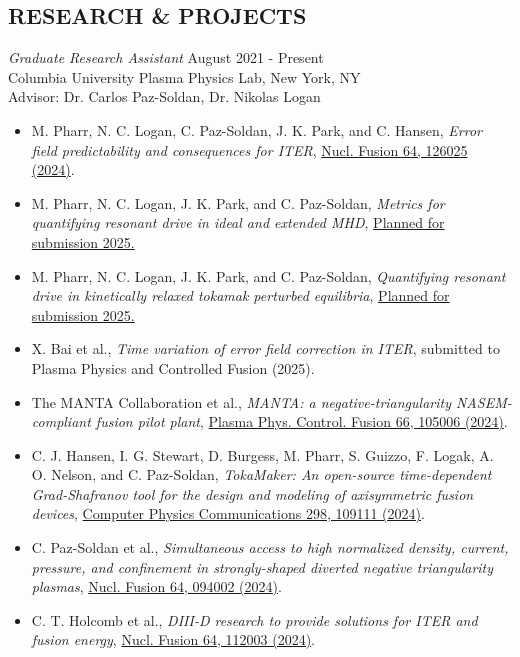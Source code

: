 \documentclass[margin]{rpires}
\begin{document}
\begin{resume}
\section{RESEARCH \& PROJECTS}
    \textit{Graduate Research Assistant} \hfill August 2021 - Present \\
    Columbia University Plasma Physics Lab, 
    New York, NY\\ 
    Advisor: Dr. Carlos Paz-Soldan, Dr. Nikolas Logan
    \begin{itemize}  \itemsep -2pt %
    \item {M. Pharr, N. C. Logan, C. Paz-Soldan, J. K. Park, and C. Hansen, \textit{Error field predictability and consequences for ITER}, \href{https://dx.doi.org/10.1088/1741-4326/ad7ed6}{Nucl. Fusion 64, 126025 (2024)}.}
    \item {M. Pharr, N. C. Logan, J. K. Park, and C. Paz-Soldan, \textit{Metrics for quantifying resonant drive in ideal and extended MHD}, \href{}{Planned for submission 2025.}}
    \item {M. Pharr, N. C. Logan, J. K. Park, and C. Paz-Soldan, \textit{Quantifying resonant drive in kinetically relaxed tokamak perturbed equilibria}, \href{}{Planned for submission 2025.}}\vspace{0.5cm}
    \item {X. Bai et al., \textit{Time variation of error field correction in ITER}, submitted to Plasma Physics and Controlled Fusion (2025).}
    \item {The MANTA Collaboration et al., \textit{MANTA: a negative-triangularity NASEM-compliant fusion pilot plant}, \href{https://iopscience.iop.org/article/10.1088/1361-6587/ad6708}{Plasma Phys. Control. Fusion 66, 105006 (2024)}.}
    \item {C. J. Hansen, I. G. Stewart, D. Burgess, M. Pharr, S. Guizzo, F. Logak, A. O. Nelson, and C. Paz-Soldan, \textit{TokaMaker: An open-source time-dependent Grad-Shafranov tool for the design and modeling of axisymmetric fusion devices}, \href{https://www.sciencedirect.com/science/article/pii/S0010465524000341}{Computer Physics Communications 298, 109111 (2024)}.}
    \item {C. Paz-Soldan et al., \textit{Simultaneous access to high normalized density, current, pressure, and confinement in strongly-shaped diverted negative triangularity plasmas}, \href{https://new.iopscience.iop.org/article/10.1088/1741-4326/ad69a4/meta}{Nucl. Fusion 64, 094002 (2024)}.}
    \item {C. T. Holcomb et al., \textit{DIII-D research to provide solutions for ITER and fusion energy}, \href{https://dx.doi.org/10.1088/1741-4326/ad2fe9}{Nucl. Fusion 64, 112003 (2024)}.}

\end{itemize}
\end{resume}
\end{document}
